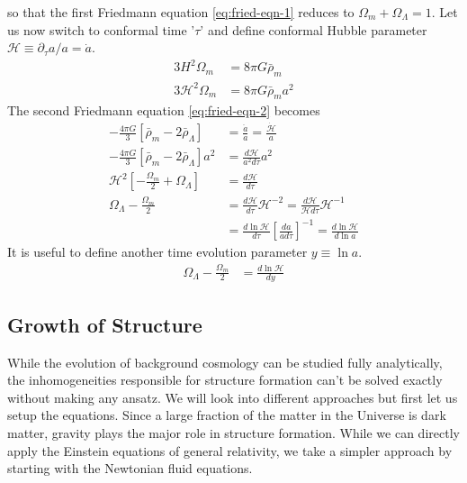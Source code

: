 \documentclass[12pt]{article}
\begin{document}
%
so that the first Friedmann equation \ref{eq:fried-eqn-1} reduces to $\Omega_{m} + \Omega_{\Lambda} = 1$. Let us now switch to conformal time '$\tau$' and define conformal Hubble parameter $\mathcal{H} \equiv \partial_\tau a / a = \dot{a}$.
\begin{align}
3 H^2 \Omega_{m} &= 8 \pi G \bar{\rho}_{m}\\
3 \mathcal{H}^2 \Omega_{m} &= 8 \pi G \bar{\rho}_{m} a^2 \label{eq:omega-m-relation}
\end{align}
The second Friedmann equation \eqref{eq:fried-eqn-2} becomes 
\begin{align}
- \frac{4\pi G}{3} \left[ \bar{\rho}_{m} - 2 \bar{\rho}_{\Lambda} \right] &=  \frac{\ddot{a}}{a} = \frac{\dot{\mathcal{H}}}{a}\\
- \frac{4\pi G}{3} \left[ \bar{\rho}_{m} - 2 \bar{\rho}_{\Lambda} \right] a^2 &= \frac{d \mathcal{H}}{a^2 d\tau} a^2\\
\label{eq:fried-eqn-2-simple}
\mathcal{H}^2 \left[ - \frac{\Omega_{m}}{2} + \Omega_{\Lambda} \right] &= \frac{d \mathcal{H}}{d\tau}\\
\Omega_{\Lambda} - \frac{\Omega_{m}}{2} &= \frac{d \mathcal{H}}{d\tau} \mathcal{H}^{-2} = \frac{d \mathcal{H}}{\mathcal{H} d\tau} \mathcal{H}^{-1}\\
&= \frac{d \ln \mathcal{H}}{d\tau}
\left[ \frac{da}{a d\tau} \right]^{-1} = \frac{d \ln \mathcal{H}}{d \ln a}
\end{align} 
It is useful to define another time evolution parameter $y \equiv \ln a$.
\begin{align}
\Omega_{\Lambda} - \frac{\Omega_{m}}{2} &= \frac{d \ln \mathcal{H}}{d y} 
\end{align}

\subsection{Growth of Structure}
\label{sec:growth-of-structure}

While the evolution of background cosmology can be studied fully analytically, the inhomogeneities responsible for structure formation can't be solved exactly without making any ansatz. We will look into different approaches but first let us setup the equations. Since a large fraction of the matter in the Universe is dark matter, gravity plays the major role in structure formation. While we can directly apply the Einstein equations of general relativity, we take a simpler approach by starting with the Newtonian fluid equations.
\end{document}
